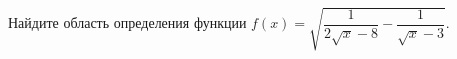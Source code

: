 \begin{ex}
	\begin{condition}
		Найдите область определения функции $f(x) = \sqrt{\dfrac{1}{2\sqrt{x} - 8} - \dfrac{1}{\sqrt{x} - 3}}.$
	\end{condition}
\end{ex}